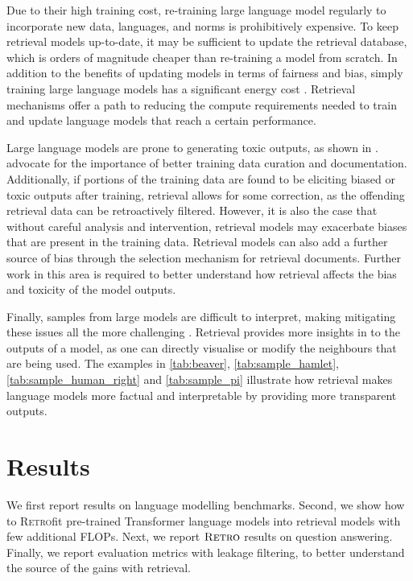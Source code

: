 Due to their high training cost, re-training large language model regularly to incorporate new data, languages, and norms is prohibitively expensive. To keep retrieval models up-to-date, it may be sufficient to update the retrieval database, which is orders of magnitude cheaper than re-training a model from scratch. In addition to the benefits of updating models in terms of fairness and bias, simply training large language models has a significant energy cost \citep{strubell2019energy, green_ai}. Retrieval mechanisms offer a path to reducing the compute requirements needed to train and update language models that reach a certain performance.

Large language models are prone to generating toxic outputs, as shown in  \citet{gehman2020realtoxicityprompts}.
\citet{bender2021dangers, jo2020lessons} advocate for the importance of better training data curation and documentation. Additionally, if portions of the training data are found to be eliciting biased or toxic outputs after training, retrieval allows for some correction, as the offending retrieval data can be retroactively filtered. However, it is also the case that without careful analysis and intervention, retrieval models may exacerbate biases that are present in the training data. Retrieval models can also add a further source of bias through the selection mechanism for retrieval documents. Further work in this area is required to better understand how retrieval affects the bias and toxicity of the model outputs.

Finally, samples from large models are difficult to interpret, making mitigating these issues all the more challenging \citep{belinkov-etal-2020-interpretability, jain-wallace-2019-attention}. Retrieval provides more insights in to the outputs of a model, as one can directly visualise or modify the neighbours that are being used. The examples in \autoref{tab:beaver}, \ref{tab:sample_hamlet}, \ref{tab:sample_human_right} and \ref{tab:sample_pi} illustrate how retrieval makes language models more factual and interpretable by providing more transparent outputs.

\section{Results}

We first report results on language modelling benchmarks. Second, we show how to \textsc{Retro}fit pre-trained Transformer language models into retrieval models with few additional FLOPs. Next, we report $\textsc{Retro}$ results on question answering. Finally, we report evaluation metrics with leakage filtering, to better understand the source of the gains with retrieval.

